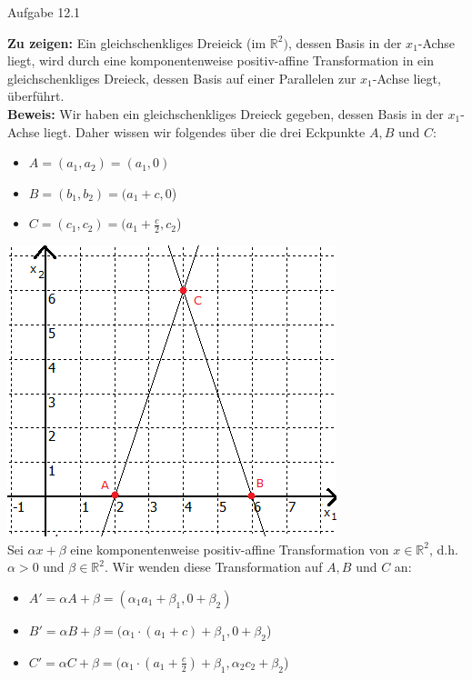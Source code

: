 \documentclass{scrartcl}
\begin{document}
\begin{Large}
Aufgabe 12.1\\[0.0cm]
\end{Large}

\textbf{Zu zeigen: }Ein gleichschenkliges Dreieick (im $\mathbb{R}^2)$, dessen Basis in der $x_1$-Achse
liegt, wird durch eine komponentenweise positiv-affine Transformation in ein gleichschenkliges Dreieck,
dessen Basis auf einer Parallelen zur $x_1$-Achse liegt, überführt. \\

\textbf{Beweis: }Wir haben ein gleichschenkliges Dreieck gegeben, dessen Basis in der $x_1$-Achse liegt.
Daher wissen wir folgendes über die drei Eckpunkte $A, B$ und $C$: \\

\begin{itemize}
\item{$A = (a_1, a_2) = (a_1, 0)$}
\item{$B = (b_1, b_2) = (a_1 + c, 0$)}
\item{$C = (c_1, c_2) = (a_1 + \frac{c}{2}, c_2$)}
\end{itemize}

\includegraphics{triangle.png} \\

Sei $\alpha x + \beta$ eine komponentenweise positiv-affine Transformation von $x \in \mathbb{R}^2$, d.h.
$\alpha > 0$ und $\beta \in \mathbb{R}^2$. Wir wenden diese Transformation auf $A, B$ und $C$ an: \\

\begin{itemize}
\item{$A' = \alpha A + \beta = (\alpha_1 a_1 + \beta_1, 0 + \beta_2)$}
\item{$B' = \alpha B + \beta = (\alpha_1 \cdot (a_1 + c) + \beta_1, 0 + \beta_2$)}
\item{$C' = \alpha C + \beta = (\alpha_1 \cdot (a_1 + \frac{c}{2}) + \beta_1, \alpha_2 c_2 + \beta_2$)}
\end{itemize}
\end{document}
